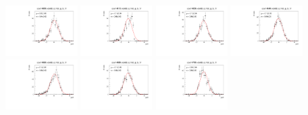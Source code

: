 \begin{figure}[h]\centering
    \includegraphics[width=0.24\textwidth]{figure/io/gls/pull_gls_epem4600_Lmdc.aLmdc_g_ls_1r.pdf}
    \includegraphics[width=0.24\textwidth]{figure/io/gls/pull_gls_epem4612_Lmdc.aLmdc_g_ls_1r.pdf}
    \includegraphics[width=0.24\textwidth]{figure/io/gls/pull_gls_epem4626_Lmdc.aLmdc_g_ls_1r.pdf}
    \includegraphics[width=0.24\textwidth]{figure/io/gls/pull_gls_epem4640_Lmdc.aLmdc_g_ls_1r.pdf}
    \includegraphics[width=0.24\textwidth]{figure/io/gls/pull_gls_epem4660_Lmdc.aLmdc_g_ls_1r.pdf}
    \includegraphics[width=0.24\textwidth]{figure/io/gls/pull_gls_epem4680_Lmdc.aLmdc_g_ls_1r.pdf}
    \includegraphics[width=0.24\textwidth]{figure/io/gls/pull_gls_epem4700_Lmdc.aLmdc_g_ls_1r.pdf}

\end{figure}
